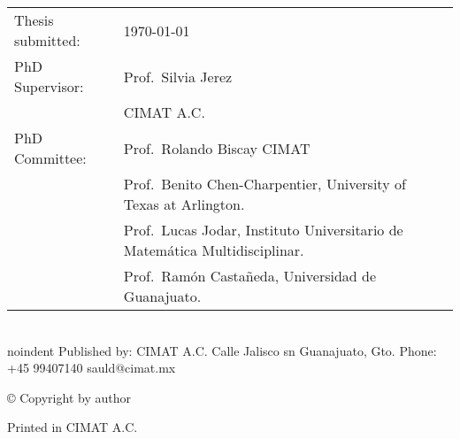 \thispagestyle{empty}
\noindent
\begin{tabularx}{\textwidth}{@{}lX}
    Thesis submitted:	& \today\\
    PhD Supervisor:		& Prof.\ Silvia Jerez\\
					    & CIMAT A.C.\\
    PhD Committee:		& Prof.\ Rolando Biscay CIMAT\\
					    & Prof.\ Benito Chen-Charpentier, 
						University of Texas at Arlington.\\
						& Prof.\ Lucas Jodar,
						Instituto Universitario de Matemática Multidisciplinar. \\
						& Prof.\ Ram\'on Casta\~{n}eda, Universidad de Guanajuato.\\
						
\end{tabularx}
\strut\vfill
\noindent
	\\noindent Published by:\newline
	CIMAT A.C. \newline
	Calle Jalisco sn\newline
	Guanajuato, Gto.\newline
	Phone: +45 99407140\newline
	sauld@cimat.mx\newline
	\strut\vfill
	\noindent \copyright{} Copyright by author\newline
	\strut\vfill
	\noindent Printed in CIMAT A.C. 
	\strut\vfill\vfill\vfill
	\clearpage

